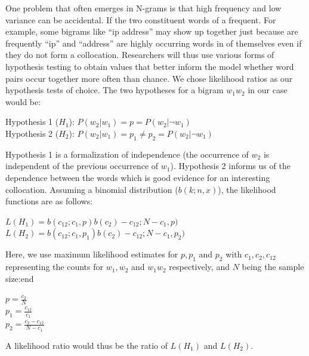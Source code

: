 One problem that often emerges in N-grams is that high frequency and low variance can be accidental. If the two constituent words of a frequent. For example, some bigrams like ``ip address'' may show up together just because  are frequently ``ip'' and ``address'' are highly occurring words in of themselves even if they do not form a collocation. Researchers will thus use various forms of hypothesis testing to obtain values that better inform the model whether word pairs occur together more often than chance. We chose likelihood ratios as our hypothesis tests of choice. The two hypotheses for a bigram $w_1w_2$ in our case would be:

\begin{center}
Hypothesis 1 ($H_1$): $P(w_2|w_1) = p = P(w_2|\neg w_1)$ \\
Hypothesis 2 ($H_2$): $P(w_2|w_1) = p_1 \neq p_2 = P(w_2|\neg w_1)$	\\	
\end{center}

Hypothesis 1 is a formalization of independence (the occurrence of $w_2$ is independent of the previous occurrence of $w_1$). Hypothesis 2 informs us of the dependence between the words which is good evidence for an interesting collocation. Assuming a binomial distribution ($b(k; n,x)$), the likelihood functions are as follows:

\begin{center}
$L(H_1) = b(c_{12}; c_1,p) b(c_2)-c_{12}; N-c_1,p)$\\
$L(H_2) = b(c_{12}; c_1,p_1) b(c_2)-c_{12}; N-c_1,p_2)$
\end{center}

Here, we use maximum likelihood estimates for $p,p_1$ and $p_2$ with $c_1,c_2,c_{12}$ representing the counts for $w_1,w_2$ and $w_1w_2$ respectively, and $N$ being the sample size:end
\begin{center}
$p=\frac{c_2}{N}$\\
$p_1=\frac{c_{12}}{c_1}$\\
$p_2=\frac{c_2-c_{12}}{N-c_1}$
\end{center}

A likelihood ratio would thus be the ratio of $L(H_1)$ and $L(H_2)$.

